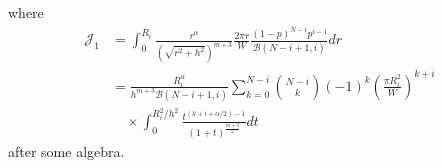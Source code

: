 \documentclass[slidestop,usepdftitle=false]{gvvslides}
\providecommand{\brak}[1]{\ensuremath{\left(#1\right)}}
\begin{document}
   \begin{frame}
  where
   \begin{align}
    \mathcal{J}_1& = \int_{0}^{R_i}\frac{r^{\alpha}}{\brak{\sqrt{r^2+h^2}}^{m+3}}\frac{2\pi r}{W}\frac{\brak{1-p}^{N-i}p^{i-1}}{\mathcal{B}\brak{N-i+1,i}}dr 
   \nonumber \\
       & = \frac{R_i^{\alpha}}{h^{m+3}\mathcal{B}\brak{N-i+1,i}}\sum_{k=0}^{N-i}\binom{N-i}{k}(-1)^k\brak{\frac{\pi R_i^2}{W}}^{k+i}
       \nonumber \\
       & \quad \times \int_{0}^{R_i^2/h^2}\frac{t^{\brak{k+i+\alpha/2}-1}}{\brak{1+t}^\frac{m+3}{2}}dt
       \label{J_1_app}
   \end{align}
after some algebra.   
\end{frame}
\end{document}
